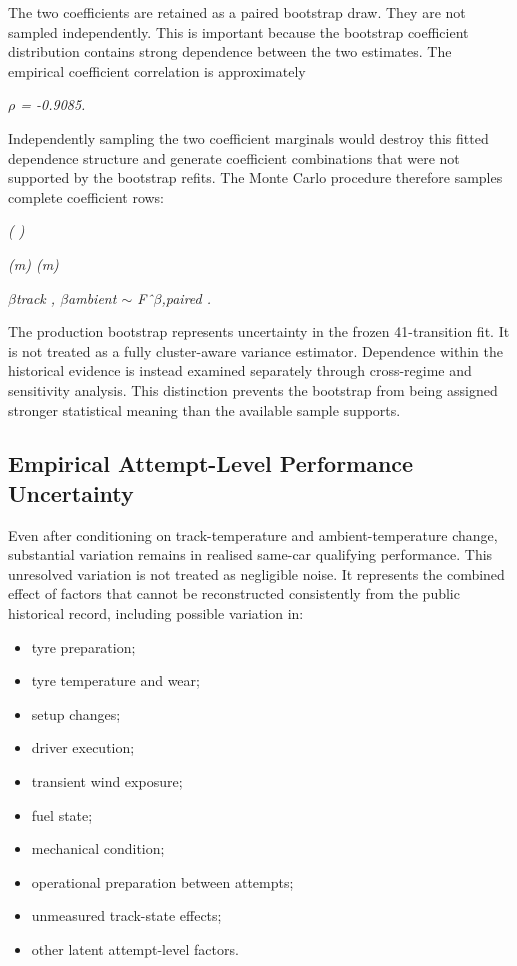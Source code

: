 The two coefficients are retained as a paired bootstrap draw. They are not sampled independently. This is important because the bootstrap coefficient distribution contains strong dependence between the two estimates. The empirical coefficient correlation is approximately

\begin{center}\textit{\ensuremath{\rho} = -0.9085.}\end{center}

Independently sampling the two coefficient marginals would destroy this fitted dependence structure and generate coefficient combinations that were not supported by the bootstrap refits. The Monte Carlo procedure therefore samples complete coefficient rows:

\begin{center}\textit{(                    )}\end{center}

\begin{center}\textit{(m)      (m)}\end{center}

\begin{center}\textit{\ensuremath{\beta}track , \ensuremath{\beta}ambient \ensuremath{\sim} Fˆ\ensuremath{\beta},paired .}\end{center}

The production bootstrap represents uncertainty in the frozen 41-transition fit. It is not treated as a fully cluster-aware variance estimator. Dependence within the historical evidence is instead examined separately through cross-regime and sensitivity analysis. This distinction prevents the bootstrap from being assigned stronger statistical meaning than the available sample supports.

\subsection{Empirical Attempt-Level Performance Uncertainty}
Even after conditioning on track-temperature and ambient-temperature change, substantial variation remains in realised same-car qualifying performance. This unresolved variation is not treated as negligible noise. It represents the combined effect of factors that cannot be reconstructed consistently from the public historical record, including possible variation in:

\begin{itemize}
\item tyre preparation;
\item tyre temperature and wear;
\item setup changes;
\item driver execution;
\item transient wind exposure;
\item fuel state;
\item mechanical condition;
\item operational preparation between attempts;
\item unmeasured track-state effects;
\item other latent attempt-level factors.
\end{itemize}

